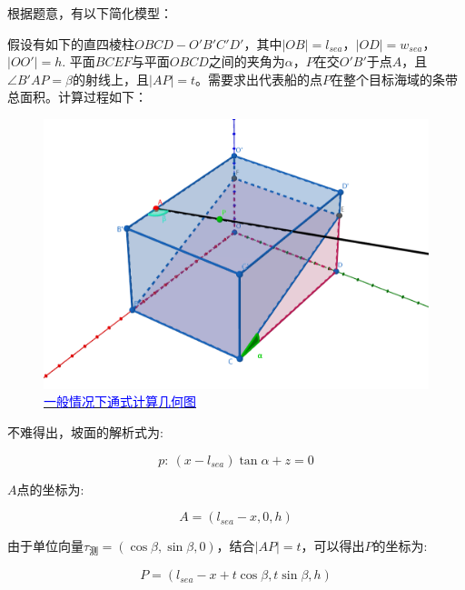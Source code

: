 

根据题意，有以下简化模型：

假设有如下的直四棱柱$OBCD - O'B'C'D'$，其中$|OB| = l_{sea}$，$|OD| = w_{sea}$，$|OO'| = h$. 平面$BCEF$与平面$OBCD$之间的夹角为$\alpha$，$P$在交$O'B'$于点$A$，且$\angle B'AP = \beta$的射线上，且$|AP| = t$。需要求出代表船的点$P$在整个目标海域的条带总面积。计算过程如下：

\begin{figure}[h]
    \centering
    \includegraphics[scale=0.3]{res/img/一般情况下通式计算几何图.png}
    \caption{\href{https://www.geogebra.org/m/jzwhwcqr}{\textcolor{blue}{一般情况下通式计算几何图}}}
    \label{fig:一般情况下通式计算几何图}
\end{figure}

不难得出，坡面的解析式为:

\begin{equation}
    p: \
    (x - l_{sea})\tan \alpha + z = 0
\end{equation}

$A$点的坐标为:

\begin{equation}
    A = (l_{sea} - x, 0, h)
\end{equation}

由于单位向量$\tau_\text{测} = (\cos \beta, \sin \beta, 0)$，结合$|AP| = t$，可以得出$P$的坐标为:

\begin{equation}
    P = (l_{sea} - x + t\cos \beta,
    t\sin \beta,
    h)
\end{equation}

